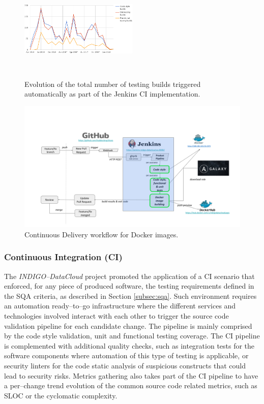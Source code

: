 \documentclass[journal]{IEEEtran}
\begin{document}
\begin{figure}[ht]
\centering
\includegraphics[width=0.5\textwidth, height=50mm]{images/jenkins_CI_builds.png}
\caption{Evolution of the total number of testing builds triggered automatically as part of the Jenkins CI implementation.}
\label{fig:fig_jenkins_CI_builds}
\end{figure}

\begin{figure}[ht]
\centering
\includegraphics[width=\textwidth]{images/devops.png}
\caption{Continuous Delivery workflow for Docker images.}
\label{fig:fig_CD}
\end{figure}


\subsubsection{Continuous Integration (CI)}
\label{subsec:ci}
The {\sl INDIGO--DataCloud} project promoted the application of a CI scenario that enforced,
for any piece of produced software, the testing requirements defined in the SQA criteria,
as described in Section \ref{subsec:sqa}. Such environment requires an automation
ready--to--go infrastructure where the different services and technologies involved interact with each
other to trigger the source code validation pipeline for each candidate change. The
pipeline is mainly comprised by the code style validation, unit and functional testing
coverage. The CI pipeline is complemented with additional quality checks, such as
integration tests for the software components where automation of this type of testing
is applicable, or security linters for the code static analysis of suspicious
constructs that could lead to security risks. Metrics gathering also takes part of
the CI pipeline to have a per--change trend evolution of the common source code
related metrics, such as SLOC or the cyclomatic complexity.
\end{document}
